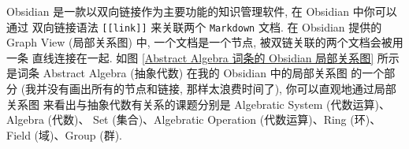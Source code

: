 \documentclass[10pt,UTF8]{book} %
\begin{document}
\begin{example}
    Obsidian 是一款以双向链接作为主要功能的知识管理软件, 在 Obsidian 中你可以通过
    双向链接语法 \lstinline|[[link]]| 来关联两个 \lstinline|Markdown| 文档.
    在 Obsidian 提供的 Graph View (局部关系图) 中, 一个文档是一个节点,
    被双链关联的两个文档会被用一条
    直线连接在一起. 如图 \ref{Abstract Algebra 词条的 Obsidian 局部关系图} 所示是词条 Abstract Algebra (抽象代数) 在我的 Obsidian 中的局部关系图
    的一个部分 (我并没有画出所有的节点和链接, 那样太浪费时间了), 你可以直观地通过局部关系图
    来看出与抽象代数有关系的课题分别是 Algebratic System (代数运算)、Algebra (代数)、
    Set (集合)、Algebratic Operation (代数运算)、Ring (环)、Field (域)、Group (群).
    \begin{figure}[H]
        \centering



        \begin{tikzpicture}[x=0.75pt,y=0.75pt,yscale=-1,xscale=1]
        

\end{tikzpicture}
\end{figure}
\end{example}
\end{document}
